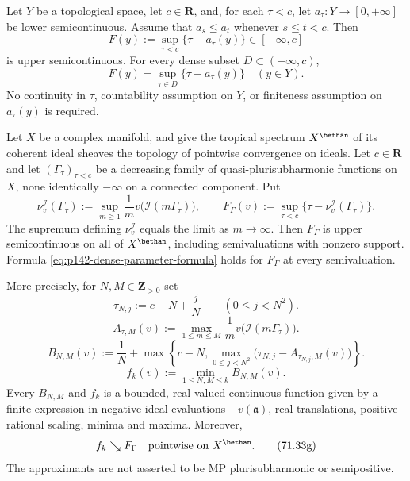 \begin{lemma}\label{lem:p142-monotone-parameter-supremum}
Let $Y$ be a topological space, let $c\in\mathbf R$, and, for each
$\tau<c$, let $a_\tau:Y\to[0,+\infty]$ be lower semicontinuous.
Assume that $a_s\leq a_t$ whenever $s\leq t<c$. Then
\[
 F(y):=\sup_{\tau<c}\{\tau-a_\tau(y)\}
 \in[-\infty,c]
\]
is upper semicontinuous. For every dense subset $D\subset(-\infty,c)$,
\[
 F(y)=\sup_{\tau\in D}\{\tau-a_\tau(y)\}
 \quad(y\in Y).
 \tag{71.33a}
 \label{eq:p142-dense-parameter-formula}
\]
No continuity in $\tau$, countability assumption on $Y$, or finiteness
assumption on $a_\tau(y)$ is required.
\end{lemma}

\begin{theorem}\label{thm:p142-raw-transform-usc}
Let $X$ be a complex manifold, and give the tropical spectrum
$X^{\bethan}$ of its coherent ideal sheaves the topology of pointwise
convergence on ideals. Let $c\in\mathbf R$ and let
$(\Gamma_\tau)_{\tau<c}$ be a
decreasing family of quasi-plurisubharmonic functions on $X$, none
identically $-\infty$ on a connected component. Put
\[
 \nu_v^{\mathcal I}(\Gamma_\tau)
 :=\sup_{m\geq1}\frac1m v\bigl(\mathcal I(m\Gamma_\tau)\bigr),
 \qquad
 F_\Gamma(v):=\sup_{\tau<c}
       \{\tau-\nu_v^{\mathcal I}(\Gamma_\tau)\}.
 \tag{71.33b}
 \label{eq:p142-raw-transform}
\]
The supremum defining $\nu_v^{\mathcal I}$ equals the limit as
$m\to\infty$. Then $F_\Gamma$ is upper semicontinuous on all of
$X^{\bethan}$, including semivaluations with nonzero support. Formula
\eqref{eq:p142-dense-parameter-formula} holds for $F_\Gamma$ at every
semivaluation.

More precisely, for $N,M\in\mathbf Z_{>0}$ set
\[
 \tau_{N,j}:=c-N+\frac jN \qquad(0\leq j<N^2).
 \tag{71.33c}
 \label{eq:p142-mesh}
\]
\[
 A_{\tau,M}(v):=\max_{1\leq m\leq M}
       \frac1m v\bigl(\mathcal I(m\Gamma_\tau)\bigr).
 \tag{71.33d}
 \label{eq:p142-finite-ideal-values}
\]
\[
 B_{N,M}(v):=\frac1N+
   \max\left\{c-N,
       \max_{0\leq j<N^2}
        \bigl(\tau_{N,j}-A_{\tau_{N,j},M}(v)\bigr)\right\}.
 \tag{71.33e}
 \label{eq:p142-upper-approximants}
\]
\[
 f_k(v):=\min_{1\leq N,M\leq k}B_{N,M}(v).
 \tag{71.33f}
 \label{eq:p142-decreasing-sequence}
\]
Every $B_{N,M}$ and $f_k$ is a bounded, real-valued continuous function
given by a finite expression in negative ideal evaluations $-v(\mathfrak a)$,
real translations, positive rational scaling, minima and maxima. Moreover,
\[
 f_k\searrow F_\Gamma\quad\hbox{pointwise on }X^{\bethan}.
 \tag{71.33g}
 \label{eq:p142-exact-sequential-limit}
\]
The approximants are not asserted to be MP plurisubharmonic or
semipositive.
\end{theorem}

